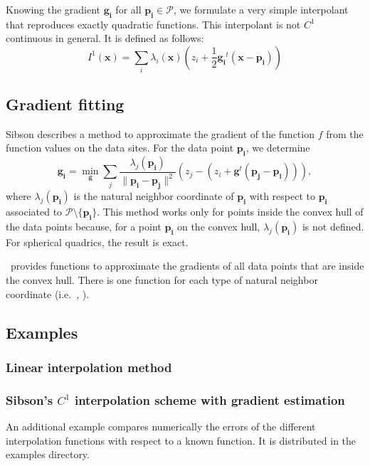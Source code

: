 Knowing the gradient $\mathbf{g_i}$ for all $\mathbf{p_i} \in
\mathcal{P}$, we formulate a very simple interpolant that reproduces
exactly quadratic functions. This interpolant is not $C^1$ continuous
in general.  It is defined as follows:
\begin{displaymath}
  I^1(\mathbf{x}) = \sum_i \lambda_i(\mathbf{x}) 
  (z_i + \frac{1}{2} \mathbf{g_i}^t (\mathbf{x} - \mathbf{p_i}))  
\end{displaymath} 



\subsection{Gradient fitting} \label{s:gradient_fitting}
Sibson describes a method to approximate the gradient of the function
$f$ from the function values on the data sites. For the data point
$\mathbf{p_i}$, we determine
$$\mathbf{g_i} 
= \min_{\mathbf{g}} 
\sum_j
\frac{\lambda_j(\mathbf{p_i})}{\|\mathbf{p_i} - \mathbf{p_j}\|^2}
\left( z_j - (z_i + \mathbf{g}^t (\mathbf{p_j} -\mathbf{p_i})) \right),
$$
where $\lambda_j(\mathbf{p_i})$ is the natural neighbor coordinate
of $\mathbf{p_i}$ with respect to $\mathbf{p_i}$ associated to
$\mathcal{P} \setminus \{\mathbf{p_i}\}$. This method works only for
points inside the convex hull of the data points because, for a point
$\mathbf{p_i}$ on the convex hull, $\lambda_j(\mathbf{p_i})$ is not
defined. For spherical quadrics, the result is exact.

\cgal\ provides functions to approximate the gradients of all data
points that are inside the convex hull. There is one function for each
type of natural neighbor coordinate (i.e.\ , ).


\subsection{Examples}\label{subsec:interpol_examples}
\subsubsection{Linear interpolation method}

\subsubsection{Sibson's $C^1$ interpolation scheme with gradient estimation}

An additional example compares numerically the errors of the different 
interpolation functions with respect to a known function. 
It is distributed in the examples directory.

